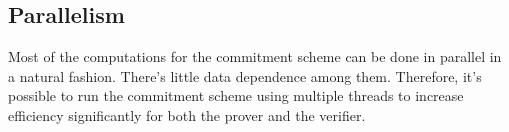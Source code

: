 \subsection{Parallelism}

Most of the computations for the commitment scheme can be done in parallel in a natural fashion. There's little data dependence among them. Therefore, it's possible to run the commitment scheme using multiple threads to increase efficiency significantly for both the prover and the verifier.


